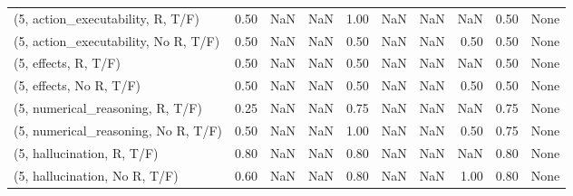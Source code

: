 \begin{table*}[h!]
\begin{adjustbox}{width=2\columnwidth,center}
\begin{tabular}{lrrr|rrr|rrr}
(5, action\_executability, R, T/F)    &                      0.50 &                   NaN &                       NaN &                          1.00 &                       NaN &                           NaN &                                    NaN &                               0.50 &                                  None \\
(5, action\_executability, No R, T/F) &                      0.50 &                   NaN &                       NaN &                          0.50 &                       NaN &                           NaN &                                   0.50 &                               0.50 &                                  None \\
(5, effects, R, T/F)                 &                      0.50 &                   NaN &                       NaN &                          0.50 &                       NaN &                           NaN &                                    NaN &                               0.50 &                                  None \\
(5, effects, No R, T/F)              &                      0.50 &                   NaN &                       NaN &                          0.50 &                       NaN &                           NaN &                                   0.50 &                               0.50 &                                  None \\
(5, numerical\_reasoning, R, T/F)     &                      0.25 &                   NaN &                       NaN &                          0.75 &                       NaN &                           NaN &                                    NaN &                               0.75 &                                  None \\
(5, numerical\_reasoning, No R, T/F)  &                      0.50 &                   NaN &                       NaN &                          1.00 &                       NaN &                           NaN &                                   0.50 &                               0.75 &                                  None \\
(5, hallucination, R, T/F)           &                      0.80 &                   NaN &                       NaN &                          0.80 &                       NaN &                           NaN &                                    NaN &                               0.80 &                                  None \\
(5, hallucination, No R, T/F)        &                      0.60 &                   NaN &                       NaN &                          0.80 &                       NaN &                           NaN &                                   1.00 &                               0.80 &                                  None \\

\end{tabular}
\end{adjustbox}
\end{table*}

